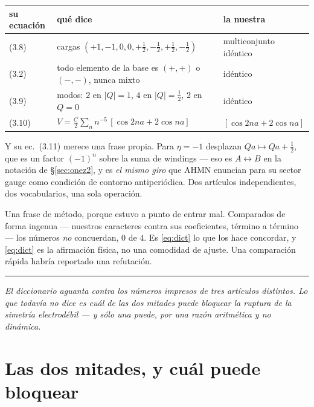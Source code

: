\documentclass[11pt,a4paper]{article}
\newcommand{\bridge}[1]{\par\medskip\noindent
  \textcolor{hdrblue!45}{\rule{2.2cm}{0.6pt}}\;\;\parbox[t]{0.84\textwidth}{\small\itshape
  \textcolor{hdrblue!85}{#1}}\par\medskip}
\begin{document}
\begin{center}\small
{}
\begin{tabular}{lll}
\toprule
\rowcolor{hdrblue!14}su ecuación & qué dice & la nuestra\\
\midrule
(3.8) & cargas $(+1,-1,0,0,+\tfrac12,-\tfrac12,+\tfrac12,-\tfrac12)$ & multiconjunto idéntico\\
(3.2) & todo elemento de la base es $(+,+)$ o $(-,-)$, nunca mixto & idéntico\\
(3.9) & modos: $2$ en $|Q|=1$, $4$ en $|Q|=\tfrac12$, $2$ en $Q=0$ & idéntico\\
(3.10) & $V=\tfrac{C}{2}\sum_n n^{-5}\,[\cos 2na + 2\cos na]$ &
$[\cos 2na + 2\cos na]$\\
\bottomrule
\end{tabular}
\end{center}

\noindent Y su ec.~(3.11) merece una frase propia. Para $\eta=-1$ desplazan $Qa\mapsto Qa+\tfrac12$,
que es un factor $(-1)^n$ sobre la suma de windings --- eso es $A\leftrightarrow B$ en la notación de
\S\ref{sec:onez2}, y es \emph{el mismo giro} que AHMN enuncian para su sector gauge como condición de
contorno antiperiódica. Dos artículos independientes, dos vocabularios, una sola operación.

Una frase de método, porque estuvo a punto de entrar mal. Comparados de forma ingenua --- nuestros
caracteres contra sus coeficientes, término a término --- los números \emph{no} concuerdan, $0$ de
$4$. Es \eqref{eq:dict} lo que los hace concordar, y \eqref{eq:dict} es la afirmación física, no una
comodidad de ajuste. Una comparación rápida habría reportado una refutación.

\bridge{El diccionario aguanta contra los números impresos de tres artículos distintos. Lo que
todavía no dice es cuál de las dos mitades puede \emph{bloquear} la ruptura de la simetría
electrodébil --- y sólo una puede, por una razón aritmética y no dinámica.}

\section{Las dos mitades, y cuál puede bloquear}\label{sec:halves}
\end{document}
